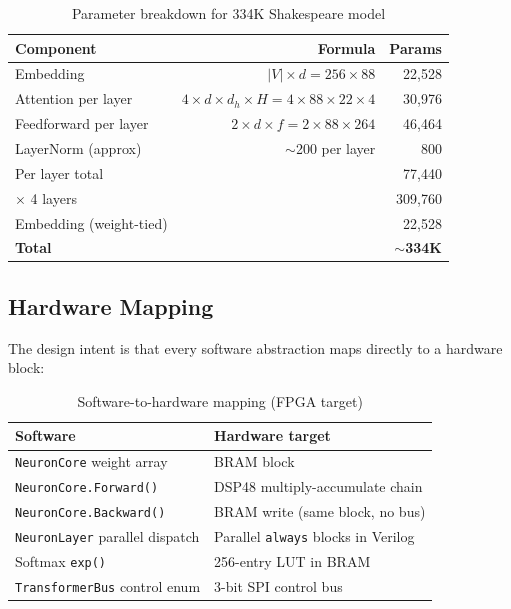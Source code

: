 \documentclass[11pt]{article}
\begin{document}
\begin{table}[ht]
\centering
\begin{tabular}{lrr}
\toprule
Component & Formula & Params \\
\midrule
Embedding & $|V| \times d = 256 \times 88$ & 22,528 \\
Attention per layer & $4 \times d \times d_h \times H = 4 \times 88 \times 22 \times 4$ & 30,976 \\
Feedforward per layer & $2 \times d \times f = 2 \times 88 \times 264$ & 46,464 \\
LayerNorm (approx) & $\sim$200 per layer & 800 \\
\midrule
Per layer total & & 77,440 \\
$\times$ 4 layers & & 309,760 \\
Embedding (weight-tied) & & 22,528 \\
\midrule
\textbf{Total} & & \textbf{$\sim$334K} \\
\bottomrule
\end{tabular}
\caption{Parameter breakdown for 334K Shakespeare model}
\label{tab:param-breakdown}
\end{table}

\subsection{Hardware Mapping}

The design intent is that every software abstraction maps directly to a hardware block:

\begin{table}[ht]
\centering
\begin{tabular}{ll}
\toprule
Software & Hardware target \\
\midrule
\texttt{NeuronCore} weight array & BRAM block \\
\texttt{NeuronCore.Forward()} & DSP48 multiply-accumulate chain \\
\texttt{NeuronCore.Backward()} & BRAM write (same block, no bus) \\
\texttt{NeuronLayer} parallel dispatch & Parallel \texttt{always} blocks in Verilog \\
Softmax \texttt{exp()} & 256-entry LUT in BRAM \\
\texttt{TransformerBus} control enum & 3-bit SPI control bus \\
\bottomrule
\end{tabular}
\caption{Software-to-hardware mapping (FPGA target)}
\end{table}
\end{document}
